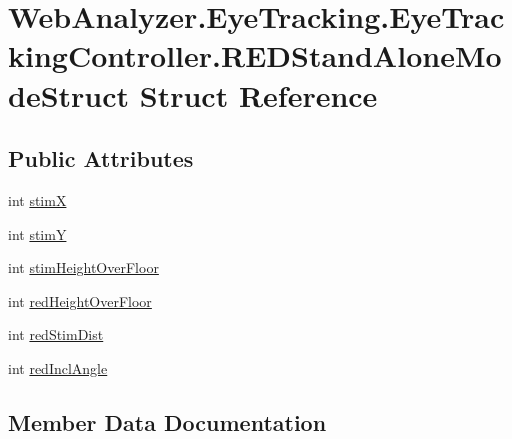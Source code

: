 \hypertarget{struct_web_analyzer_1_1_eye_tracking_1_1_eye_tracking_controller_1_1_r_e_d_stand_alone_mode_struct}{}\section{Web\+Analyzer.\+Eye\+Tracking.\+Eye\+Tracking\+Controller.\+R\+E\+D\+Stand\+Alone\+Mode\+Struct Struct Reference}
\label{struct_web_analyzer_1_1_eye_tracking_1_1_eye_tracking_controller_1_1_r_e_d_stand_alone_mode_struct}
\subsection*{Public Attributes}
\begin{DoxyCompactItemize}
\item 
int \hyperlink{struct_web_analyzer_1_1_eye_tracking_1_1_eye_tracking_controller_1_1_r_e_d_stand_alone_mode_struct_aa155f1c99fa1d08ee3c65ac0a1363671}{stim\+X}
\item 
int \hyperlink{struct_web_analyzer_1_1_eye_tracking_1_1_eye_tracking_controller_1_1_r_e_d_stand_alone_mode_struct_a46cc02eae0a855e5eb072465c2f71b20}{stim\+Y}
\item 
int \hyperlink{struct_web_analyzer_1_1_eye_tracking_1_1_eye_tracking_controller_1_1_r_e_d_stand_alone_mode_struct_a5417e3edc728964dd39f4c8f1fbdd81e}{stim\+Height\+Over\+Floor}
\item 
int \hyperlink{struct_web_analyzer_1_1_eye_tracking_1_1_eye_tracking_controller_1_1_r_e_d_stand_alone_mode_struct_a9dd50ed140859eebb3e125546219994b}{red\+Height\+Over\+Floor}
\item 
int \hyperlink{struct_web_analyzer_1_1_eye_tracking_1_1_eye_tracking_controller_1_1_r_e_d_stand_alone_mode_struct_ad1e052936d5d557745fd0fda3f4d8b74}{red\+Stim\+Dist}
\item 
int \hyperlink{struct_web_analyzer_1_1_eye_tracking_1_1_eye_tracking_controller_1_1_r_e_d_stand_alone_mode_struct_a663c317ed281fcb42f2e084990efe8f1}{red\+Incl\+Angle}
\end{DoxyCompactItemize}


\subsection{Member Data Documentation}
\hypertarget{struct_web_analyzer_1_1_eye_tracking_1_1_eye_tracking_controller_1_1_r_e_d_stand_alone_mode_struct_a9dd50ed140859eebb3e125546219994b}{}
